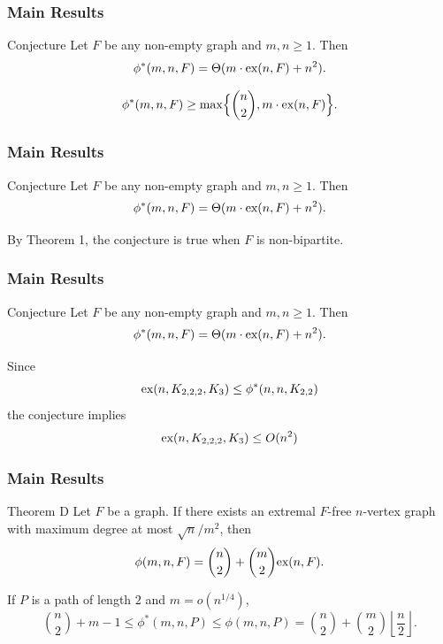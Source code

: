 \documentclass{beamer}
\newcommand*{\ex}{\textnormal{ex}}
\begin{document}
\begin{frame}
  \frametitle{Main Results}

  \begin{block}{Conjecture}
    Let $F$ be any non-empty graph and $m, n \geq 1$. Then
    \[ 
      \phi^*(m,n,F) = \Theta(m \cdot \ex(n,F) + n^2).
    \]
  \end{block}

  \pause

  \vspace{0.3cm}

  \[ 
    \phi^*(m,n,F) \geq \max\Bigl\{\binom{n}{2},m\cdot \ex(n,F)\Bigr\}.
  \]
\end{frame}

\begin{frame}
  \frametitle{Main Results}

  \begin{block}{Conjecture}
    Let $F$ be any non-empty graph and $m, n \geq 1$. Then
    \[ 
      \phi^*(m,n,F) = \Theta(m \cdot \ex(n,F) + n^2).
    \]
  \end{block}

  \vspace{0.5cm}

  By Theorem 1, the conjecture is true when $F$ is non-bipartite.
\end{frame}

\begin{frame}
  \frametitle{Main Results}

  \begin{block}{Conjecture}
    Let $F$ be any non-empty graph and $m, n \geq 1$. Then
    \[ 
      \phi^*(m,n,F) = \Theta(m \cdot \ex(n,F) + n^2).
    \]
  \end{block}

  \vspace{0.3cm}

  Since
  \[
    \ex(n, K_{2, 2, 2}, K_3) \leq \phi^*(n, n, K_{2, 2})
  \]
  the conjecture implies
  \[
    \ex(n, K_{2, 2, 2}, K_3) \leq O(n^{2})
  \]
\end{frame}

\begin{frame}
  \frametitle{Main Results}

  \begin{block}{Theorem D}
    Let $F$ be a graph. If there exists an extremal $F$-free $n$-vertex graph with maximum degree at most $\sqrt{n}/m^2$, then 
    \[ 
      \phi(m, n, F) = \binom{n}{2} + \binom{m}{2}\ex(n,F).
    \]
  \end{block}

  \pause

  \vspace{0.3cm}

  If $P$ is a path of length $2$ and $m = o(n^{1/4})$, 
  \[
    \binom{n}{2} + m - 1 \leq \phi^*(m, n, P) \leq \phi(m, n, P) = \binom{n}{2} + \binom{m}{2} \left\lfloor \frac{n}{2}\right\rfloor. 
  \]
\end{frame}
\end{document}
